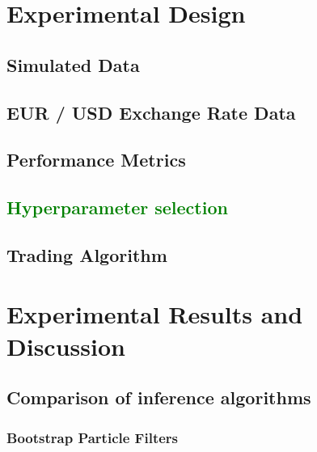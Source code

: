 \documentclass[12pt]{article}
\newcommand{\tofix}[1]{
    \textcolor{green}{#1}
}
\begin{document}
\section{Experimental Design}

	\subsection{Simulated Data} \label{sec:experimental_simulated}
	
	\subsection{EUR / USD Exchange Rate Data} \label{sec:experimental_real}
	
	\subsection{Performance Metrics}\label{sec:experimental_performance}
	
	\subsection{\tofix{Hyperparameter selection}} \label{sec:experimental_hyperparameter}
	
	\subsection{Trading Algorithm}

\section{Experimental Results and Discussion}

    \subsection{Comparison of inference algorithms} \label{sec:results_comparison}
    
    	\subsubsection{Bootstrap Particle Filters} \label{sec:results_drift_corrected}
    	
\end{document}
